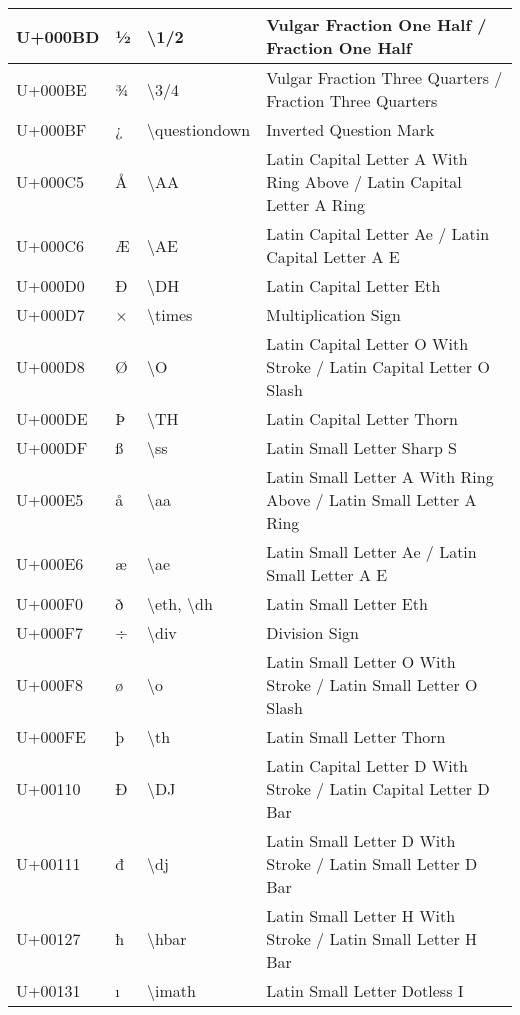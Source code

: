 \begin{table}[h]
\begin{tabulary}{\linewidth}{|L|L|L|L|}
\hline
U+000BD & ½ & {\textbackslash}1/2 & Vulgar Fraction One Half / Fraction One Half \\
\hline
U+000BE & ¾ & {\textbackslash}3/4 & Vulgar Fraction Three Quarters / Fraction Three Quarters \\
\hline
U+000BF & ¿ & {\textbackslash}questiondown & Inverted Question Mark \\
\hline
U+000C5 & Å & {\textbackslash}AA & Latin Capital Letter A With Ring Above / Latin Capital Letter A Ring \\
\hline
U+000C6 & Æ & {\textbackslash}AE & Latin Capital Letter Ae / Latin Capital Letter A E \\
\hline
U+000D0 & Ð & {\textbackslash}DH & Latin Capital Letter Eth \\
\hline
U+000D7 & × & {\textbackslash}times & Multiplication Sign \\
\hline
U+000D8 & Ø & {\textbackslash}O & Latin Capital Letter O With Stroke / Latin Capital Letter O Slash \\
\hline
U+000DE & Þ & {\textbackslash}TH & Latin Capital Letter Thorn \\
\hline
U+000DF & ß & {\textbackslash}ss & Latin Small Letter Sharp S \\
\hline
U+000E5 & å & {\textbackslash}aa & Latin Small Letter A With Ring Above / Latin Small Letter A Ring \\
\hline
U+000E6 & æ & {\textbackslash}ae & Latin Small Letter Ae / Latin Small Letter A E \\
\hline
U+000F0 & ð & {\textbackslash}eth, {\textbackslash}dh & Latin Small Letter Eth \\
\hline
U+000F7 & ÷ & {\textbackslash}div & Division Sign \\
\hline
U+000F8 & ø & {\textbackslash}o & Latin Small Letter O With Stroke / Latin Small Letter O Slash \\
\hline
U+000FE & þ & {\textbackslash}th & Latin Small Letter Thorn \\
\hline
U+00110 & Đ & {\textbackslash}DJ & Latin Capital Letter D With Stroke / Latin Capital Letter D Bar \\
\hline
U+00111 & đ & {\textbackslash}dj & Latin Small Letter D With Stroke / Latin Small Letter D Bar \\
\hline
U+00127 & ħ & {\textbackslash}hbar & Latin Small Letter H With Stroke / Latin Small Letter H Bar \\
\hline
U+00131 & ı & {\textbackslash}imath & Latin Small Letter Dotless I \\
\hline

\end{tabulary}
\end{table}
